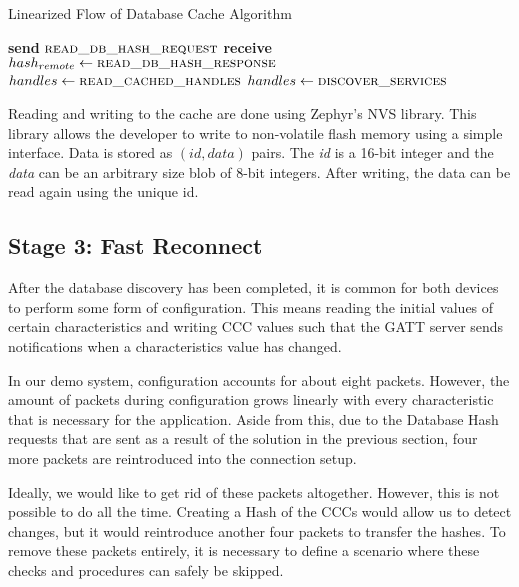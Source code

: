 \begin{algorithm}
    \caption{Linearized Flow of Database Cache Algorithm}
    \label{alg:zephyr_caching}
    \begin{algorithmic}[1] 
            \State \textbf{send} $\Call{read\_db\_hash\_request}{}$
            \State \textbf{receive} $hash_{remote} \gets \Call{read\_db\_hash\_response}{}$
                    \State $handles \gets \Call{read\_cached\_handles}{}$
                    \State {}
                    \State \Return
                \EndIf
            \EndIf
            \State $handles \gets\Call{discover\_services}{}$
            \State {}
            \State {}
        \EndProcedure
    \end{algorithmic}
\end{algorithm}

Reading and writing to the cache are done using Zephyr's NVS library. This library allows the developer to write to non-volatile flash memory using a simple interface. Data is stored as $(id, data)$ pairs. The \textit{id} is a 16-bit integer and the \textit{data} can be an arbitrary size blob of 8-bit integers. After writing, the data can be read again using the unique id.


\subsection{Stage 3: Fast Reconnect}
After the database discovery has been completed, it is common for both devices to perform some form of configuration. This means reading the initial values of certain characteristics and writing CCC values such that the GATT server sends notifications when a characteristics value has changed. 

In our demo system, configuration accounts for about eight packets. However, the amount of packets during configuration grows linearly with every characteristic that is necessary for the application. Aside from this, due to the Database Hash requests that are sent as a result of the solution in the previous section, four more packets are reintroduced into the connection setup.

Ideally, we would like to get rid of these packets altogether. However, this is not possible to do all the time. Creating a Hash of the CCCs would allow us to detect changes, but it would reintroduce another four packets to transfer the hashes. To remove these packets entirely, it is necessary to define a scenario where these checks and procedures can safely be skipped.

